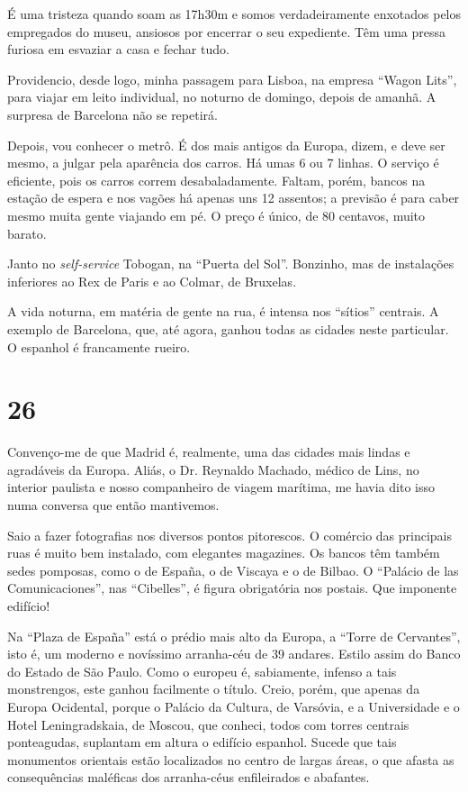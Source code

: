 É uma tristeza quando soam as 17h30m e somos verdadeiramente enxotados pelos empregados do museu, ansiosos por encerrar o seu expediente. Têm uma pressa furiosa em esvaziar a casa e fechar tudo.

Providencio, desde logo, minha passagem para Lisboa, na empresa ``Wagon Lits'', para viajar em leito individual, no noturno de domingo, depois de amanhã. A surpresa de Barcelona não se repetirá.

Depois, vou conhecer o metrô. É dos mais antigos da Europa, dizem, e deve ser mesmo, a julgar pela aparência dos carros. Há umas 6 ou 7 linhas. O serviço é eficiente, pois os carros correm desabaladamente. Faltam, porém, bancos na estação de espera e nos vagões há apenas uns 12 assentos; a previsão é para caber mesmo muita gente viajando em pé. O preço é único, de 80 centavos, muito barato.

Janto no \textit{self-service} Tobogan, na ``Puerta del Sol''. Bonzinho, mas de instalações inferiores ao Rex de Paris e ao Colmar, de Bruxelas.

A vida noturna, em matéria de gente na rua, é intensa nos ``sítios'' centrais. A exemplo de Barcelona, que, até agora, ganhou todas as cidades neste particular. O espanhol é francamente rueiro.

\section*{26 \adfflatleafright {}}
Convenço-me de que Madrid é, realmente, uma das cidades mais lindas e agradáveis da Europa. Aliás, o Dr. Reynaldo Machado, médico de Lins, no interior paulista e nosso companheiro de viagem marítima, me havia dito isso numa conversa que então mantivemos.

Saio a fazer fotografias nos diversos pontos pitorescos. O comércio das principais ruas é muito bem instalado, com elegantes magazines. Os bancos têm também sedes pomposas, como o de España, o de Viscaya e o de Bilbao. O ``Palácio de las Comunicaciones'', nas ``Cibelles'', é figura obrigatória nos postais. Que imponente edifício!

Na ``Plaza de España'' está o prédio mais alto da Europa, a ``Torre de Cervantes'', isto é, um moderno e novíssimo arranha-céu de 39 andares. Estilo assim do Banco do Estado de São Paulo. Como o europeu é, sabiamente, infenso a tais monstrengos, este ganhou facilmente o título. Creio, porém, que apenas da Europa Ocidental, porque o Palácio da Cultura, de Varsóvia, e a Universidade e o Hotel Leningradskaia, de Moscou, que conheci, todos com torres centrais ponteagudas, suplantam em altura o edifício espanhol. Sucede que tais monumentos orientais estão localizados no centro de largas áreas, o que afasta as consequências maléficas dos arranha-céus enfileirados e abafantes.


